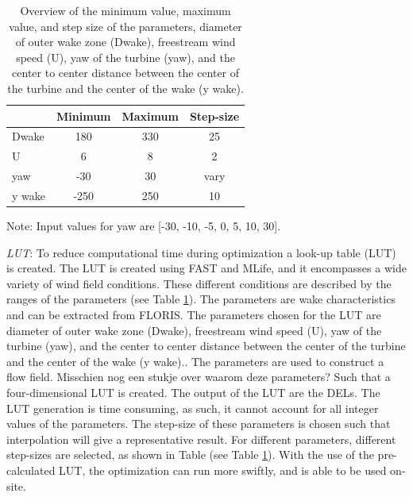 \documentclass[twoside,twocolumn]{article}
\begin{document}
\begin{table}[h]
	\caption{Overview of the minimum value, maximum value, and step size of the parameters, diameter of outer wake zone (Dwake), freestream wind speed (U), yaw of the turbine (yaw), and the center to center distance between the center of the turbine and the center of the wake (y wake).}
	\centering
	\label{tab:pars}
	\begin{tabular}{lccc}
	\hline
	 & Minimum & Maximum & Step-size \\ 
	\hline
	Dwake & 180 & 330 & 25 \\
	U & 6 & 8 & 2 \\
	yaw & -30 & 30 & vary \\
	y wake & -250 & 250 & 10 \\
	\hline
	\end{tabular}

Note: Input values for yaw are [-30, -10, -5, 0, 5, 10, 30].
\end{table}


\textit{LUT}: To reduce computational time during optimization a look-up table (LUT) is created. The LUT is created using FAST and MLife, and it encompasses a wide variety of wind field conditions. 
These different conditions are described by the ranges of the parameters (see Table \ref{tab:pars}). The parameters are wake characteristics and can be extracted from FLORIS. The parameters chosen for the LUT are diameter of outer wake zone (Dwake), freestream wind speed (U), yaw of the turbine (yaw), and the center to center distance between the center of the turbine and the center of the wake (y wake).. The parameters are used to construct a flow field. Misschien nog een stukje over waarom deze parameters? Such that a four-dimensional LUT is created. The output of the LUT are the DELs. The LUT generation is time consuming, as such, it cannot account for all integer values of the parameters. The step-size of these parameters is chosen such that interpolation will give a representative result. For different parameters, different step-sizes are selected, as shown in Table (see Table \ref{tab:pars}). With the use of the pre-calculated LUT, the optimization can run more swiftly, and is able to be used on-site.
\end{document}
